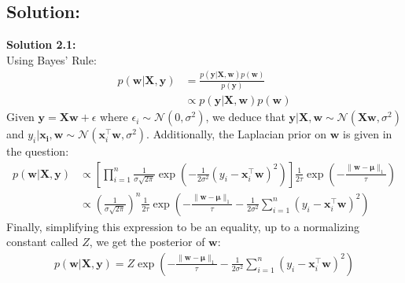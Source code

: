 \documentclass[submit]{harvardml}
\begin{document}
\subsection*{Solution:}
\noindent\textbf{Solution 2.1:}\\
Using Bayes' Rule:
\begin{align*}
    p(\mathbf{w}|\mathbf{X}, \mathbf{y}) &= \frac{p(\mathbf{y}|\mathbf{X},\mathbf{w})p(\mathbf{w})}{p(\mathbf{y})}\\
    &\propto p(\mathbf{y}|\mathbf{X},\mathbf{w})p(\mathbf{w})
\end{align*}
Given $\mathbf{y} = \mathbf{X}\mathbf{w} + \epsilon$ where $\epsilon_i \sim\mathcal{N}(0,\sigma^2)$, we deduce that $\mathbf{y}|\mathbf{X}, \mathbf{w} \sim \mathcal{N}(\mathbf{X}\mathbf{w},\sigma^2)$ and $y_i | \mathbf{x_i}, \mathbf{w} \sim \mathcal{N}(\mathbf{x}_i^\top \mathbf{w},\sigma^2)$. Additionally, the Laplacian prior on $\mathbf{w}$ is given in the question:
\begin{align*}
    p(\mathbf{w}|\mathbf{X}, \mathbf{y}) &\propto \left[ \prod_{i=1}^{n} \frac{1}{\sigma\sqrt{2\pi}} \exp\left( -\frac{1}{2 \sigma^2}\left(y_i- \mathbf{x}_i^\top \mathbf{w} \right)^{2}\right) \right] \frac{1}{2\tau}\exp\left(-\frac{\|\mathbf{w}-\mathbf{\mu}\|_1}{\tau}\right)\\
    &\propto \left(\frac{1}{\sigma\sqrt{2\pi}}\right)^n \frac{1}{2\tau} \exp\left(-\frac{\|\mathbf{w}-\mathbf{\mu}\|_1}{\tau} -\frac{1}{2 \sigma^2} \sum_{i=1}^n \left(y_i- \mathbf{x}_i^\top \mathbf{w} \right)^{2}\right)
\end{align*}
Finally, simplifying this expression to be an equality, up to a normalizing constant called $Z$, we get the posterior of $\mathbf{w}$:
\begin{align*}
    p(\mathbf{w}|\mathbf{X}, \mathbf{y}) = Z \exp\left(-\frac{\|\mathbf{w}-\mathbf{\mu}\|_1}{\tau} -\frac{1}{2 \sigma^2} \sum_{i=1}^n \left(y_i- \mathbf{x}_i^\top \mathbf{w} \right)^{2}\right)
\end{align*}
\end{document}

